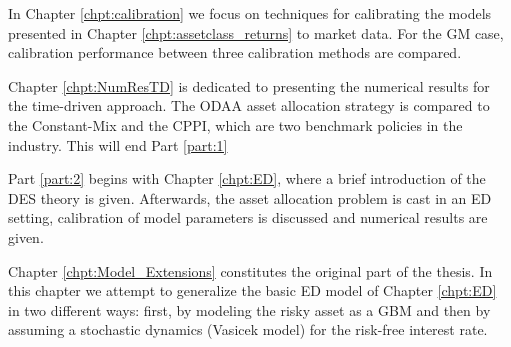 In Chapter \ref{chpt:calibration} we focus on techniques for calibrating the models presented in Chapter \ref{chpt:assetclass_returns} to market data. For the \gls{GM} case, calibration performance between three calibration methods are compared.


Chapter \ref{chpt:NumResTD} is dedicated to presenting the numerical results for the time-driven approach. The \gls{ODAA} asset allocation strategy is compared to the Constant-Mix and the CPPI, which are two benchmark policies in the industry. This will end Part \ref{part:1}

Part \ref{part:2} begins with Chapter \ref{chpt:ED}, where a brief introduction of the \gls{DES} theory is given. Afterwards, the asset allocation problem is cast in an \gls{ED} setting, calibration of model parameters is discussed and numerical results are given. 

Chapter \ref{chpt:Model_Extensions} constitutes the original part of the thesis. In this chapter we attempt to generalize the basic \gls{ED} model of Chapter \ref{chpt:ED} in two different ways: first, by modeling the risky asset as a \gls{GBM} and then by assuming a stochastic dynamics (Vasicek model) for the risk-free interest rate. 









